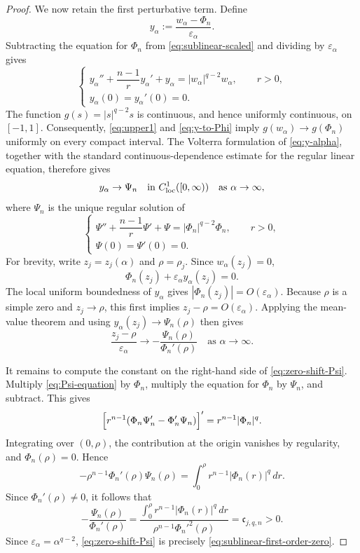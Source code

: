 \documentclass[11pt]{article}
\begin{document}
\begin{proof}
We now retain the first perturbative term.  Define
\[
 y_\alpha:=\frac{w_\alpha-\Phi_n}{\varepsilon_\alpha}.
\]
Subtracting the equation for $\Phi_n$ from
\eqref{eq:sublinear-scaled} and dividing by
$\varepsilon_\alpha$ gives
\begin{equation}
 \begin{cases}
 y_\alpha''+\dfrac{n-1}{r}y_\alpha'+y_\alpha
 =|w_\alpha|^{q-2}w_\alpha,\qquad  r>0,\\[4pt]
 y_\alpha(0)=y_\alpha'(0)=0.
 \end{cases}
 \label{eq:y-alpha}
\end{equation}
The function $g(s)=|s|^{q-2}s$ is continuous, and hence uniformly continuous, on $[-1,1]$.
Consequently, \eqref{eq:upper1} and \eqref{eq:y-to-Phi} imply
$g(w_\alpha)\to g(\Phi_n)$ uniformly on every compact interval.
The Volterra formulation of \eqref{eq:y-alpha}, together with the
standard continuous-dependence estimate for the regular linear
equation, therefore gives
\begin{equation*}
 y_\alpha\rightarrow\Psi_n
 \quad\text{in }C^1_{\rm loc}([0,\infty)){\quad\text{as }\alpha\rightarrow\infty},
\end{equation*}
where $\Psi_n$ is the unique regular solution of
\begin{equation}
 \begin{cases}
 \Psi''+\dfrac{n-1}{r}\Psi'+\Psi
 =|\Phi_n|^{q-2}\Phi_n,\qquad  r>0,\\[4pt]
 \Psi(0)=\Psi'(0)=0.
 \end{cases}
 \label{eq:Psi-equation}
\end{equation}
For brevity, write $z_j=z_j(\alpha)$ and $\rho=\rho_j$.
{Since $w_\alpha(z_j)=0$,
\[
 \Phi_n(z_j)+\varepsilon_\alpha y_\alpha(z_j)=0.
\]
The local uniform boundedness of $y_\alpha$ gives
$|\Phi_n(z_j)|=O(\varepsilon_\alpha)$.  Because $\rho$ is a simple zero
and $z_j\to\rho$, this first implies
$z_j-\rho=O(\varepsilon_\alpha)$.  Applying the mean-value theorem and
using $y_\alpha(z_j)\to\Psi_n(\rho)$ then gives}
\begin{equation}
\frac{z_j-\rho}{\varepsilon_\alpha}
\longrightarrow
-\frac{\Psi_n(\rho)}{\Phi_n'(\rho)}\quad \text{as }\alpha\rightarrow\infty.
\label{eq:zero-shift-Psi}
\end{equation}

It remains to compute the constant on the right-hand side of \eqref{eq:zero-shift-Psi}. Multiply \eqref{eq:Psi-equation} by $\Phi_n$, multiply the equation for $\Phi_n$ by $\Psi_n$, and subtract. This gives %
\[
 \Bigl[r^{n-1}(\Phi_n\Psi_n'-\Phi_n'\Psi_n)\Bigr]'
 =r^{n-1}|\Phi_n|^q.
\]
{Integrating over $(0,\rho)$, the contribution at the origin
vanishes by regularity, and $\Phi_n(\rho)=0$. Hence}
\[
 -\rho^{n-1}\Phi_n'(\rho)\Psi_n(\rho)
 =\int_0^\rho r^{n-1}|\Phi_n(r)|^q\,dr.
\]
Since $\Phi_n'(\rho)\neq0$, it follows that
\[
 -\frac{\Psi_n(\rho)}{\Phi_n'(\rho)}
 =\frac{\displaystyle\int_0^\rho
 r^{n-1}|\Phi_n(r)|^q\,dr}
 {\rho^{n-1}\Phi_n'^2(\rho)}
 =\mathfrak c_{j,q,n}>0.
\]
Since $\varepsilon_\alpha=\alpha^{q-2}$,
\eqref{eq:zero-shift-Psi} is precisely
\eqref{eq:sublinear-first-order-zero}.
\end{proof}
\end{document}
